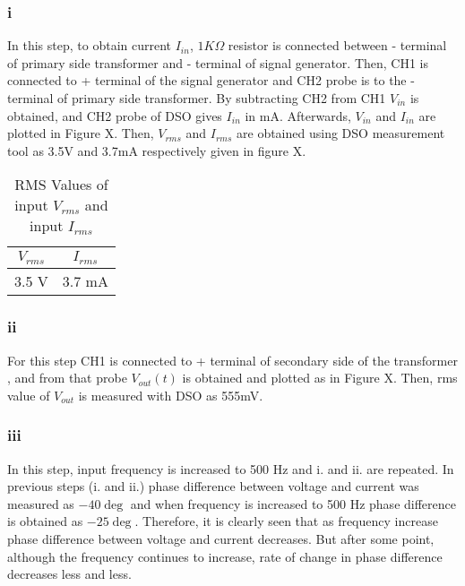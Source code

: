 \documentclass[letterpaper,12pt]{article}
\begin{document}
\subsubsection{i}
In this step, to obtain current \(I_{in}\), \(1K\Omega \) resistor is connected between - terminal of primary side transformer and - terminal of signal generator. Then, CH1 is connected to + terminal of the signal generator and CH2 probe is to the - terminal of primary side transformer. By subtracting CH2 from CH1 \(V_{in}\) is obtained, and CH2 probe of DSO gives \(I_{in}\) in mA. Afterwards, \(V_{in}\) and \(I_{in}\) are plotted in Figure X. Then, \(V_{rms}\) and \(I_{rms}\) are obtained using DSO measurement tool as 3.5V and 3.7mA respectively given in figure X. 
\begin{table}[H]
    \begin{center}
        \caption{RMS Values of input \(V_{rms}\) and input \(I_{rms}\)}
        \vspace{2mm}
        \begin{tabular}{||c | c ||} 
            \hline
            \(V_{rms}\) & \(I_{rms}\) \\ [0.5ex] 
            \hline\hline
            3.5 V & 3.7 mA    \\
            \hline
        \end{tabular}
    \end{center}
\end{table}

\subsubsection{ii}
For this step CH1 is connected to + terminal of secondary side of the transformer , and from that probe \(V_{out}(t)\) is obtained and plotted as in Figure X. Then, rms value of \(V_{out}\) is measured with DSO as 555mV.
\subsubsection{iii}
In this step, input frequency is increased to 500 Hz and i. and ii. are repeated. In previous steps (i. and ii.) phase difference between voltage and current was measured as \(-40\deg \) and when frequency is increased to 500 Hz phase difference is obtained as \(-25\deg\). Therefore, it is clearly seen that as frequency increase phase difference between voltage and current decreases. But after some point, although the frequency continues to increase, rate of change in phase difference decreases less and less.
%
\end{document}
